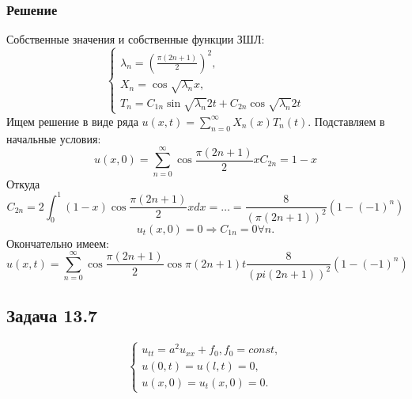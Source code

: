 \documentclass[11pt]{article}
\begin{document}
\subsubsection{Решение}
\label{sec:org93c5539}
Собственные значения и собственные функции ЗШЛ:
\begin{equation}
\begin{cases}
\lambda_n = \left(\frac{\pi(2n + 1)}2\right)^2, \\
X_n = \cos\sqrt{\lambda_n}x, \\
T_n = C_{1n}\sin\sqrt{\lambda_n}2t + C_{2n}\cos\sqrt{\lambda_n}2t
\end{cases}
\end{equation}
Ищем решение в виде ряда $u(x, t) = \sum_{n = 0}^{\infty}X_n(x)T_n(t)$. Подставляем в начальные
условия:
\begin{equation}
u(x, 0) = \sum_{n = 0}^{\infty}\cos\frac{\pi (2n + 1)}2xC_{2n} = 1 - x
\end{equation}
Откуда
\begin{equation}
C_{2n} = 2\int_0^1(1 - x)\cos\frac{\pi (2n + 1)}2xdx = \ldots = \frac8{(\pi(2n + 1))^2}(1 - (-1)^n)
\end{equation}
\begin{equation}
u_t(x, 0) = 0 \Rightarrow C_{1n} = 0 \forall n.
\end{equation}
Окончательно имеем:
\begin{equation}
u(x, t) = \sum_{n = 0}^{\infty}\cos\frac{\pi(2n + 1)}2\cos\pi(2n + 1)t\frac8{(pi(2n + 1))^2}(1 - (-1)^n)
\end{equation}
\subsection{Задача 13.7}
\label{sec:org956db55}
\begin{equation}
\begin{cases}
u_{tt} = a^2u_{xx} + f_0, f_0 = const, \\
u(0, t) = u(l, t) = 0, \\
u(x, 0) = u_t(x, 0) = 0.
\end{cases}
\end{equation}
\end{document}
